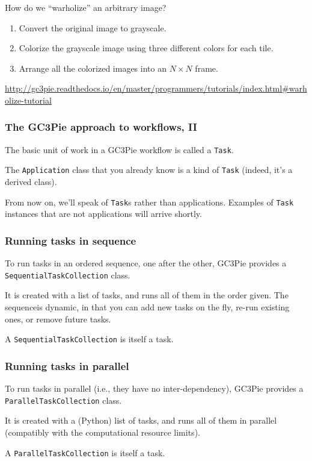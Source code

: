 \documentclass[english,serif,mathserif,xcolor=pdftex,dvipsnames,table]{beamer}
\begin{document}
\begin{frame}
How do we ``warholize'' an arbitrary image?

\+
\begin{enumerate}
\item Convert the original image to grayscale.
\item Colorize the grayscale image using three different colors for each tile.
\item Arrange all the colorized images into an $N\times N$ frame.
\end{enumerate}

\+
\begin{references}
  \url{http://gc3pie.readthedocs.io/en/master/programmers/tutorials/index.html#warholize-tutorial}
\end{references}
\end{frame}


\begin{frame}
  \frametitle{The GC3Pie approach to workflows, II}

  The basic unit of work in a GC3Pie workflow is called a \texttt{Task}.

  \+
  The \texttt{Application} class that you already know is a kind of
  \texttt{Task} (indeed, it's a derived class).

  \+
  From now on, we'll speak of \texttt{Task}s rather than
  applications.  Examples of \texttt{Task} instances that are not
  applications will arrive shortly.
\end{frame}


\begin{frame}
  \frametitle{Running tasks in sequence}

  To run tasks in an ordered sequence, one after the other, GC3Pie
  provides a \texttt{SequentialTaskCollection} class.

  \+
  It is created with a list of tasks, and runs all of them in the
  order given.  The sequenceis dynamic, in that you can add new tasks
  on the fly, re-run existing ones, or remove future tasks.

  \+
  A \texttt{SequentialTaskCollection} is itself a task.
\end{frame}


\begin{frame}
  \frametitle{Running tasks in parallel}

  To run tasks in parallel (i.e., they have no inter-dependency),
  GC3Pie provides a \texttt{ParallelTaskCollection} class.

  \+
  It is created with a (Python) list of tasks, and runs all of them
  in parallel (compatibly with the computational resource limits).

  \+
  A \texttt{ParallelTaskCollection} is itself a task.

\end{frame}
\end{document}
